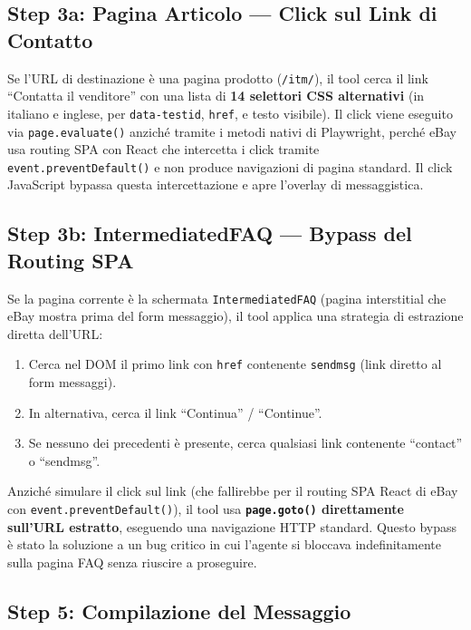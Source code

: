 \subsection{Step 3a: Pagina Articolo — Click sul Link di Contatto}
\label{subsec:pw-contact-item}

Se l'URL di destinazione è una pagina prodotto (\texttt{/itm/}),
il tool cerca il link ``Contatta il venditore'' con una lista di
\textbf{14 selettori CSS alternativi} (in italiano e inglese, per
\texttt{data-testid}, \texttt{href}, e testo visibile). Il click
viene eseguito via \texttt{page.evaluate()} anziché tramite i metodi
nativi di Playwright, perché eBay usa routing SPA con React che
intercetta i click tramite \texttt{event.preventDefault()} e non
produce navigazioni di pagina standard. Il click JavaScript bypassa
questa intercettazione e apre l'overlay di messaggistica.

\subsection{Step 3b: IntermediatedFAQ — Bypass del Routing SPA}
\label{subsec:pw-contact-faq}

Se la pagina corrente è la schermata \texttt{IntermediatedFAQ}
(pagina interstitial che eBay mostra prima del form messaggio), il
tool applica una strategia di estrazione diretta dell'URL:

\begin{enumerate}
    \item Cerca nel DOM il primo link con \texttt{href} contenente
        \texttt{sendmsg} (link diretto al form messaggi).
    \item In alternativa, cerca il link ``Continua'' / ``Continue''.
    \item Se nessuno dei precedenti è presente, cerca qualsiasi link
        contenente ``contact'' o ``sendmsg''.
\end{enumerate}

Anziché simulare il click sul link (che fallirebbe per il routing SPA
React di eBay con \texttt{event.preventDefault()}), il tool usa
\textbf{\texttt{page.goto()} direttamente sull'URL estratto}, eseguendo
una navigazione HTTP standard. Questo bypass è stato la soluzione a
un bug critico in cui l'agente si bloccava indefinitamente sulla
pagina FAQ senza riuscire a proseguire.

\subsection{Step 5: Compilazione del Messaggio}
\label{subsec:pw-contact-fill}

